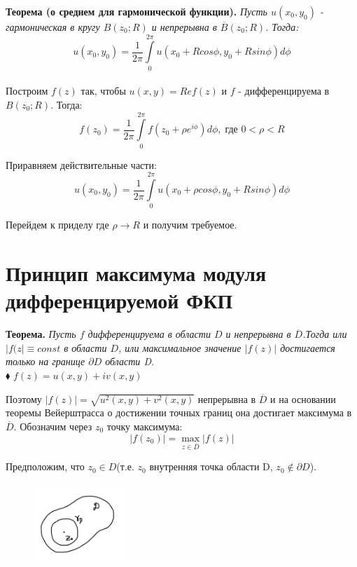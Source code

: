 \documentclass[a4paper, 12pt]{report}
\begin{document}
  \textbf{Теорема (о среднем для гармонической функции).} \quad \textit{Пусть $u(x_0, y_0)$ - гармоническая в кругу $B(z_0; R)$ и непрерывна в $\overline{B}(z_0; R)$. Тогда:
  \[
    u(x_0, y_0) = \frac{1}{2\pi}\int\limits_{0}^{2\pi}u(x_0 + Rcos\phi, y_0 + Rsin\phi)d\phi
  \]
  } \\
  \blacklozenge \hspace{4 mm}
    Построим $f(z)$ так, чтобы $u(x, y)=Re f(z)$ и $f$ - дифференцируема в $B(z_0; R)$. Тогда:
    \[
        f(z_0) = \frac{1}{2\pi}\int\limits_{0}^{2\pi}f(z_0 + \rho e^{i\phi})d\phi, \; \text{где } 0 < \rho < R
    \]
    
    Приравняем действительные части:
    \[
        u(x_0, y_0) = \frac{1}{2\pi} \int\limits_{0}^{2\pi}u(x_0+\rho cos\phi, y_0 + Rsin\phi)d\phi
    \]
    
    Перейдем к приделу где $\rho \rightarrow R$ и получим требуемое.
  \blacksquare
  
  
  
  
  
  
  
  
  
\section{Принцип максимума модуля дифференцируемой ФКП}
\par\bigskip
\textbf{Теорема.} \textit{\quad Пусть $f$ дифференцируема в области $D$ и непрерывна в $\overline{D}$.Тогда или $|f(z|\equiv const$ в области $D$, или максимальное значение $|f(z)|$ достигается только на границе $\partial D$ области D.} \\
\bigskip
$\blacklozenge$ \hspace{1 mm} $f(z)=u(x,y)+iv(x,y)$
\par
Поэтому $|f(z)|=\sqrt{u^2(x,y)+v^2(x,y)}$ непрерывна в $\overline{D}$ и на основании теоремы Вейерштрасса о достижении точных границ она достигает максимума в $\overline{D}$. Обозначим через $z_0$ точку максимума:
$$|f(z_0)|= \max_{z \in \overline{D}} |f(z)|$$
\par Предположим, что  $z_0\in D$(т.е. $z_0$ внутренняя точка области D, $z_0\not\in \partial D$).


\begin{figure} 
    \vspace{-25pt}
    \includegraphics[width=0.3\textwidth]{max mod FKP/1maxModFKP.png}
\end{figure}
\end{document}
